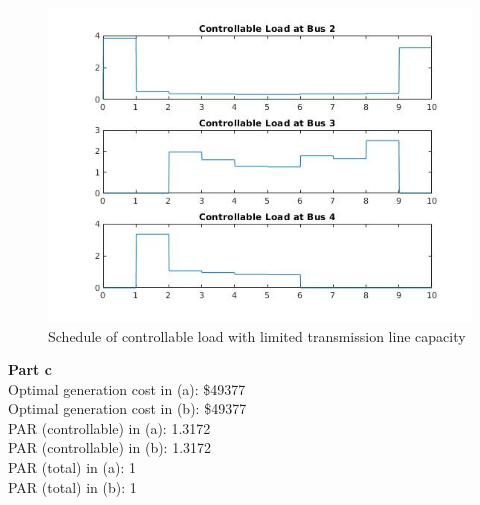 \documentclass[11pt]{article}
\begin{document}
\begin{figure}[H]
    \centering
    \includegraphics[scale=0.6]{figs/q2_b.jpg}
    \caption{Schedule of controllable load with limited transmission line capacity}
    \label{fig::q2b}
\end{figure}

\noindent
\textbf{Part c} \\
Optimal generation cost in (a): \$49377 \\
Optimal generation cost in (b): \$49377 \\
PAR (controllable) in (a): 1.3172   \\
PAR (controllable) in (b): 1.3172   \\
PAR (total) in (a): 1  \\
PAR (total) in (b): 1

\pagebreak
\end{document}

